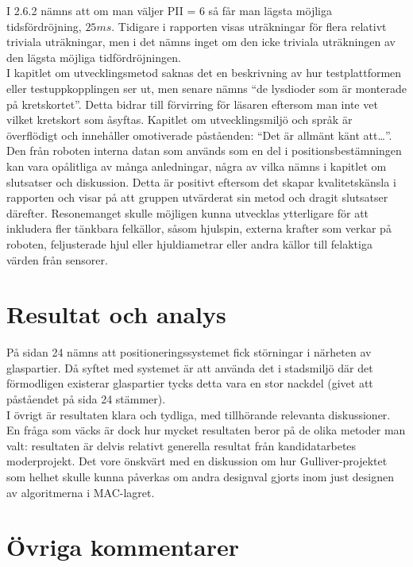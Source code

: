 \documentclass[a4paper,11pt]{article}
\begin{document}
I 2.6.2 nämns att om man väljer PII = 6 så får man lägsta möjliga tidsfördröjning, $25 ms$. Tidigare i rapporten visas uträkningar för flera relativt triviala uträkningar, men i det nämns inget om den icke triviala uträkningen av den lägsta möjliga tidfördröjningen. \\

I kapitlet om utvecklingsmetod saknas det en beskrivning av hur testplattformen eller testuppkopplingen ser ut, men senare nämns “de lysdioder som är monterade på kretskortet”. Detta bidrar till förvirring för läsaren eftersom man inte vet vilket kretskort som åsyftas. Kapitlet om utvecklingsmiljö och språk är överflödigt och innehåller omotiverade påståenden: “Det är allmänt känt att…”.  \\

Den från roboten interna datan som används som en del i positionsbestämningen kan vara opålitliga av många anledningar, några av vilka nämns i kapitlet om slutsatser och diskussion. Detta är positivt eftersom det skapar kvalitetskänsla i rapporten och visar på att gruppen utvärderat sin metod och dragit slutsatser därefter. Resonemanget skulle möjligen kunna utvecklas ytterligare för att inkludera fler tänkbara felkällor, såsom hjulspin, externa krafter som verkar på roboten, feljusterade hjul eller hjuldiametrar eller andra källor till felaktiga värden från sensorer. \\

\section{Resultat och analys}

På sidan 24 nämns att positioneringssystemet fick störningar i närheten av glaspartier. Då syftet med systemet är att använda det i stadsmiljö där det förmodligen existerar glaspartier tycks detta vara en stor nackdel (givet att påståendet på sida 24 stämmer). \\

I övrigt är resultaten klara och tydliga, med tillhörande relevanta diskussioner. En fråga som väcks är dock hur mycket resultaten beror på de olika metoder man valt: resultaten är delvis relativt generella resultat från kandidatarbetes moderprojekt. Det vore önskvärt med en diskussion om hur Gulliver-projektet som helhet skulle kunna påverkas om andra designval gjorts inom just designen av algoritmerna i MAC-lagret. \\

\section{Övriga kommentarer}
\end{document}
